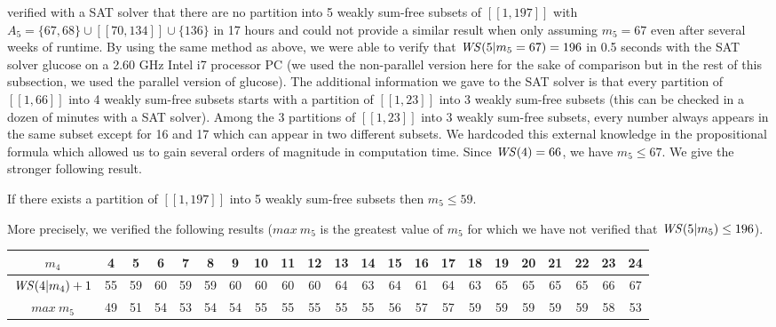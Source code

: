 \par
\cite{ELIAHOU2012175} verified with a SAT solver that there are no partition into 5 weakly sum-free subsets of
\([\![1,197]\!]\) with
\(A_5 = \{67, 68\} \cup [\![70,134]\!] \cup \{136\}\) in 17 hours and could not provide a similar result when only
assuming \(m_5 = 67\) even after several
weeks of runtime. By using the same method as above, we were able to verify that \(\mathit{WS} (5 | m_5 = 67) = 196\) in 0.5
seconds with the SAT solver glucose \cite{Glucose}
on a 2.60 GHz Intel i7 processor PC (we used the non-parallel version here for the sake of comparison but in the rest of
this subsection, we used the parallel version of glucose).
The additional information we gave to the SAT solver is that every partition of \([\![1,66]\!]\) into 4 weakly sum-free
subsets starts with a partition of
\([\![1,23]\!]\) into 3 weakly sum-free subsets (this can be checked in a dozen of minutes with a SAT solver). Among
the 3 partitions of \([\![1,23]\!]\) into
3 weakly sum-free subsets, every number always appears in the same subset except for 16 and 17 which can appear in two
different subsets. We hardcoded
this external knowledge in the propositional formula which allowed us to gain several orders of magnitude in computation
time. Since \(\mathit{WS} (4) = 66\), we have \(m_5 \leqslant 67\). We give the stronger following result.


\begin{computational theorem}
If there exists a partition of \([\![1,197]\!]\) into 5 weakly sum-free subsets then \(m_5 \leqslant 59\).
\end{computational theorem}

More precisely, we verified the following results (\(max~m_5\) is the greatest value of \(m_5\) for which we have not
verified that \(\mathit{WS} (5 | m_5) \leq 196\)).

\renewcommand{\arraystretch}{1.5}
\setlength{\tabcolsep}{3pt}

\begin{center}
\begin{tabular}{| c | *{21}{c |}}
	\hline
	\(m_4\) & 4 & 5 & 6 & 7 & 8 & 9 & 10 & 11 & 12 & 13 & 14 & 15 & 16 & 17 & 18 & 19 & 20 & 21 & 22 & 23 & 24 \\
	\hline
	\(\mathit{WS} (4 | m_4) + 1\) & 55 & 59 & 60 & 59 & 59 & 60 & 60 & 60 & 60 & 64 & 63 & 64 & 61 & 64 & 63 & 65 & 65 & 65 & 65 & 66
	& 67 \\
	\hline
	\(max~m_5\) & 49 & 51 & 54 & 53 & 54 & 54 & 55 & 55 & 55 & 55 & 55 & 56 & 57 & 57 & 59 & 59 & 59 & 59 & 59 & 58 & 53 \\
	\hline
\end{tabular}
\end{center}

